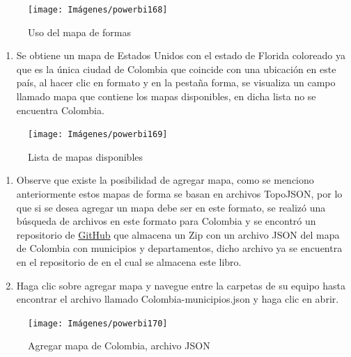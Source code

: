 \documentclass[
]{book}
\providecommand{\tightlist}{%
  \setlength{\itemsep}{0pt}\setlength{\parskip}{0pt}}
\begin{document}
\begin{figure}

{\centering \texttt{[image: Imágenes/powerbi168]} 

}

\caption{Uso del mapa de formas}\label{fig:paso3mapadeformas-fig}
\end{figure}

\begin{enumerate}
\def\labelenumi{\arabic{enumi}.}
\setcounter{enumi}{3}
\tightlist
\item
  Se obtiene un mapa de Estados Unidos con el estado de Florida coloreado ya que es la única ciudad de Colombia que coincide con una ubicación en este país, al hacer clic en formato y en la pestaña forma, se visualiza un campo llamado mapa que contiene los mapas disponibles, en dicha lista no se encuentra Colombia.
\end{enumerate}

\begin{figure}

{\centering \texttt{[image: Imágenes/powerbi169]} 

}

\caption{Lista de mapas disponibles}\label{fig:paso4mapadeformas-fig}
\end{figure}

\begin{enumerate}
\def\labelenumi{\arabic{enumi}.}
\setcounter{enumi}{4}
\item
  Observe que existe la posibilidad de agregar mapa, como se menciono anteriormente estos mapas de forma se basan en archivos TopoJSON, por lo que si se desea agregar un mapa debe ser en este formato, se realizó una búsqueda de archivos en este formato para Colombia y se encontró un repositorio de \href{https://gist.github.com/john-guerra/727e8992e9599b9d9f1dbfdc4c8e479e}{GitHub} que almacena un Zip con un archivo JSON del mapa de Colombia con municipios y departamentos, dicho archivo ya se encuentra en el repositorio de en el cual se almacena este libro.
\item
  Haga clic sobre agregar mapa y navegue entre la carpetas de su equipo hasta encontrar el archivo llamado Colombia-municipios.json y haga clic en abrir.
\end{enumerate}

\begin{figure}

{\centering \texttt{[image: Imágenes/powerbi170]} 

}

\caption{Agregar mapa de Colombia, archivo JSON}\label{fig:paso6mapadeformas-fig}
\end{figure}
\end{document}
